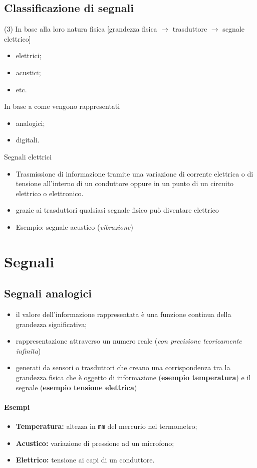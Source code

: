 \documentclass{book}
\begin{document}
\subsection{Classificazione di segnali}
\begin{tasks}(3)
	\task In base alla loro natura fisica [grandezza fisica $\to$ trasduttore
	$\to$ segnale elettrico]
	\begin{itemize}
		\item elettrici;
		\item acustici;
		\item etc.
	\end{itemize}
	\task In base a come vengono rappresentati
	\begin{itemize}
		\item analogici;
		\item digitali.
	\end{itemize}
	\task Segnali elettrici
	\begin{itemize}
		\item Trasmissione di informazione tramite una variazione di corrente
			elettrica o di tensione all'interno di un conduttore oppure in un
			punto di un circuito elettrico o elettronico.
		\item grazie ai trasduttori qualsiasi segnale fisico può diventare
			elettrico
		\item Esempio: segnale acustico (\textit{vibrazione})
	\end{itemize}
\end{tasks}
\section{Segnali}
\subsection{Segnali analogici \label{sanalog}}
\begin{itemize}
	\item il valore dell'informazione rappresentata è una funzione continua
		della grandezza significativa;
	\item rappresentazione attraverso un numero reale (\textit{con precisione
		teoricamente infinita})
	\item generati da sensori o trasduttori che creano una corrispondenza tra
		la grandezza fisica che è oggetto di informazione (\textbf{esempio
		temperatura}) e il segnale (\textbf{esempio tensione elettrica})
\end{itemize}
\paragraph{Esempi}
\begin{itemize}
	\item \textbf{Temperatura:} altezza in \texttt{mm} del mercurio nel
		termometro;
	\item \textbf{Acustico:} variazione di pressione ad un microfono;
	\item \textbf{Elettrico:} tensione ai capi di un conduttore.
\end{itemize}
\end{document}
